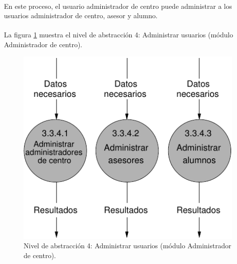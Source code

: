 \paragraph{}En este proceso, el usuario administrador de centro puede
administrar a los usuarios administrador de centro, asesor y alumno.


\paragraph{}La figura \ref{diagramaNivel4-AdministrarUsuarios-admCentro}
muestra el nivel de abstracción 4: Administrar usuarios (módulo Administrador
de centro).

  \begin{figure}[!ht]
    \begin{center}
      \includegraphics[]{08.Analisis_Funcional/8.2.DFDs/Niveles/Nivel4/AdministradorCentro/AdministrarUsuarios/Diagramas/nivel4-AdministrarUsuarios.pdf}
      \caption{Nivel de abstracción 4: Administrar usuarios (módulo Administrador
de centro).}
      \label{diagramaNivel4-AdministrarUsuarios-admCentro}
    \end{center}
  \end{figure}
